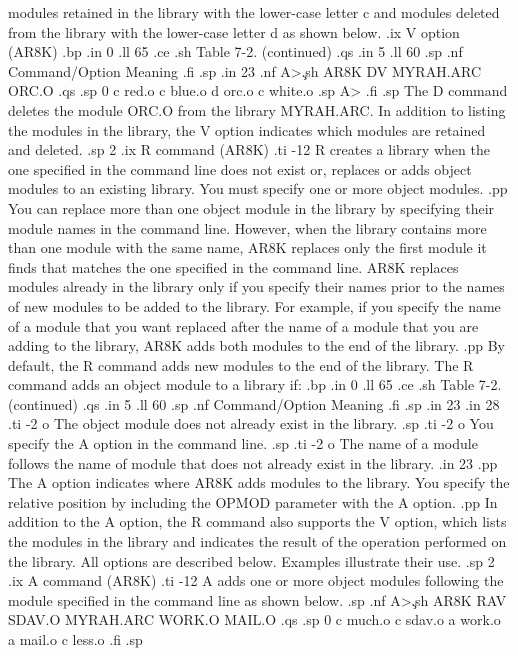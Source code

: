 modules retained in the library with the lower-case letter c and modules
deleted from the library with the lower-case letter d as shown below. 
.ix V option (AR8K)
.bp
.in 0
.ll 65
.ce
.sh
Table 7-2.  (continued)
.qs
.in 5
.ll 60
.sp
.nf
Command/Option                   Meaning
.fi
.sp
.in 23
.nf 
A>\c
.sh
AR8K DV MYRAH.ARC ORC.O
.qs
.sp 0
c red.o
c blue.o
d orc.o
c white.o
.sp
A>
.fi
.sp 
The D command deletes the module ORC.O from the library MYRAH.ARC.  
In addition to listing the modules in the library, the V option 
indicates which modules are retained and deleted.
.sp 2
.ix R command (AR8K)
.ti -12
R           creates a library when the one specified in the command line
does not exist or, replaces or adds object modules to an existing
library.  You must specify one or more object modules. 
.pp
You can replace more than one object module in the library by
specifying their module names in the command line.  However, when the
library contains more than one module with the same name, AR8K
replaces only the first module it finds that matches the one
specified in the command line.  AR8K replaces modules
already in the library only if you specify their names prior to
the names of new modules to be added to the library.  For
example, if you specify the name of a module that you want
replaced after the name of a module that you are adding to the
library, AR8K adds both modules to the end of the library.
.pp 
By default, the R command adds new modules to the end of the 
library.  The R command adds an object module to a library if:
.bp
.in 0
.ll 65
.ce
.sh
Table 7-2.  (continued)
.qs
.in 5
.ll 60
.sp
.nf
Command/Option                   Meaning
.fi
.sp
.in 23
.in 28
.ti -2
o The object module does not already exist in the 
library. 
.sp
.ti -2
o You specify the A option in the command line.
.sp
.ti -2
o The name of a module follows the name of module 
that does not already exist in the library.
.in 23
.pp
The A option indicates
where AR8K adds modules to the library.  You specify the relative 
position by including the OPMOD parameter with the A option.
.pp
In addition to the A option, the R command also
supports the V option, which lists the modules in the library and
indicates the result of the operation performed on the library. 
All options are described below.   Examples illustrate their use.
.sp 2
.ix A command (AR8K)
.ti -12
A           adds one or more object modules following the module
specified in the command line as shown below.
.sp
.nf
A>\c
.sh
AR8K RAV SDAV.O MYRAH.ARC WORK.O MAIL.O 
.qs
.sp 0
c much.o
c sdav.o
a work.o
a mail.o
c less.o
.fi
.sp

